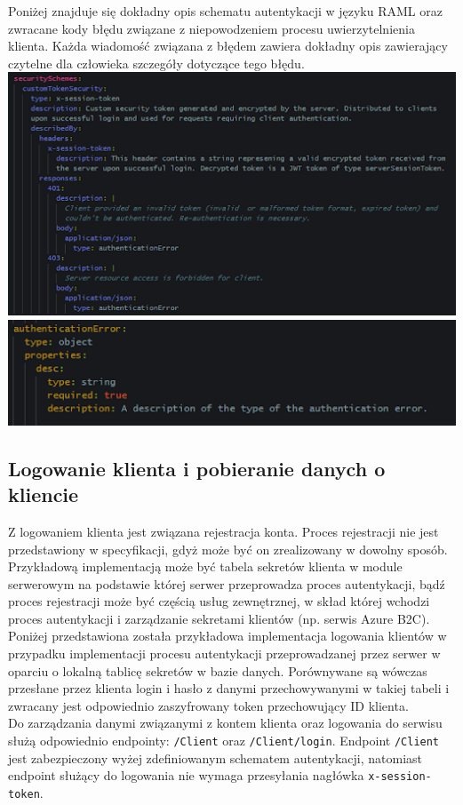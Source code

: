 \documentclass{article}
\begin{document}
\indent Poniżej znajduje się dokładny opis schematu autentykacji w języku RAML oraz zwracane kody błędu związane z niepowodzeniem procesu uwierzytelnienia klienta. Każda wiadomość związana z błędem zawiera dokładny opis zawierający czytelne dla człowieka szczegóły dotyczące tego błędu.
\newline
\includegraphics[width=\linewidth]{Client login + authentication/authentication_scheme.png}
\newline
\newline
\includegraphics[width=\linewidth]{Client login + authentication/authentication_error.png}

\subsection{Logowanie klienta i pobieranie danych o kliencie}
\indent \indent Z logowaniem klienta jest związana rejestracja konta. Proces rejestracji nie jest przedstawiony w specyfikacji, gdyż może być on zrealizowany w dowolny sposób. Przykładową implementacją może być tabela sekretów klienta w module serwerowym na podstawie której serwer przeprowadza proces autentykacji, bądź proces rejestracji może być częścią usług zewnętrznej, w skład której wchodzi proces autentykacji i zarządzanie sekretami klientów (np. serwis Azure B2C). Poniżej przedstawiona została przykładowa implementacja logowania klientów w przypadku implementacji procesu autentykacji przeprowadzanej przez serwer w oparciu o lokalną tablicę sekretów w bazie danych. Porównywane są wówczas przesłane przez klienta login i hasło z danymi przechowywanymi w takiej tabeli i zwracany jest odpowiednio zaszyfrowany token przechowujący ID klienta.\\
\indent Do zarządzania danymi związanymi z kontem klienta oraz logowania do serwisu służą odpowiednio endpointy: \texttt{/Client} oraz \texttt{/Client/login}. Endpoint \texttt{/Client} jest zabezpieczony wyżej zdefiniowanym schematem autentykacji, natomiast endpoint służący do logowania nie wymaga przesyłania nagłówka \texttt{x-session-token}.
\end{document}
